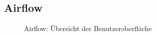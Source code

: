 \subsection{Airflow}
\label{app:Airflow}
\begin{figure}[htb]
\centering
{}
\caption{Airflow: Übersicht der Benutzeroberfläche}
\end{figure}

